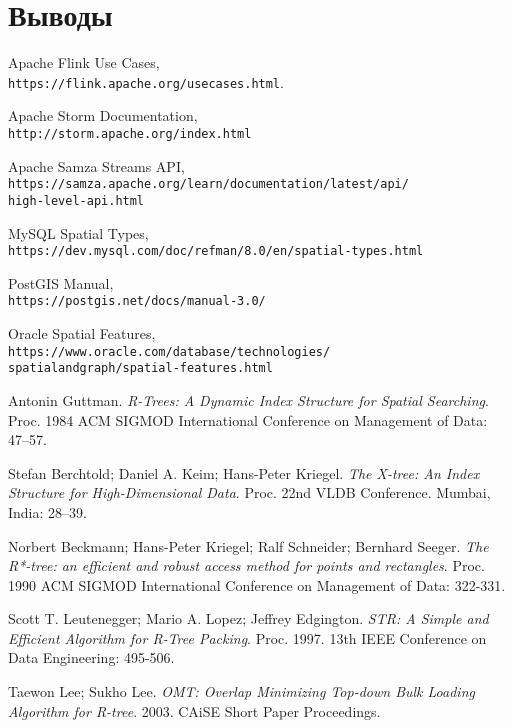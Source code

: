 \documentclass[14pt]{article}
\begin{document}
\section{Выводы}

\begin{thebibliography}{9}
Apache Flink Use Cases,\\
\texttt{https://flink.apache.org/usecases.html}.

Apache Storm Documentation,\\
\texttt{http://storm.apache.org/index.html}

Apache Samza Streams API,\\
\texttt{https://samza.apache.org/learn/documentation/latest/api/\\high-level-api.html}

MySQL Spatial Types,\\
\texttt{https://dev.mysql.com/doc/refman/8.0/en/spatial-types.html}

PostGIS Manual,\\
\texttt{https://postgis.net/docs/manual-3.0/}

Oracle Spatial Features,\\
\texttt{https://www.oracle.com/database/technologies/\\spatialandgraph/spatial-features.html}

Antonin Guttman. \textit{R-Trees: A Dynamic Index Structure for Spatial Searching}. Proc. 1984 ACM SIGMOD International Conference on Management of Data: 47–57.

Stefan Berchtold; Daniel A. Keim; Hans-Peter Kriegel. \textit{The X-tree: An Index Structure for High-Dimensional Data}. Proc. 22nd VLDB Conference. Mumbai, India: 28–39.

Norbert Beckmann; Hans-Peter Kriegel; Ralf Schneider; Bernhard Seeger. \textit{The R*-tree: an efficient and robust access method for points and rectangles}. Proc. 1990 ACM SIGMOD International Conference on Management of Data: 322-331.

Scott T. Leutenegger; Mario A. Lopez; Jeffrey Edgington. \textit{STR: A Simple and Efficient Algorithm for R-Tree Packing}. Proc. 1997. 13th IEEE Conference on Data Engineering: 495-506.

Taewon Lee; Sukho Lee. \textit{OMT: Overlap Minimizing Top-down Bulk Loading Algorithm for R-tree}. 2003. CAiSE Short Paper Proceedings.


\end{thebibliography}
\end{document}
